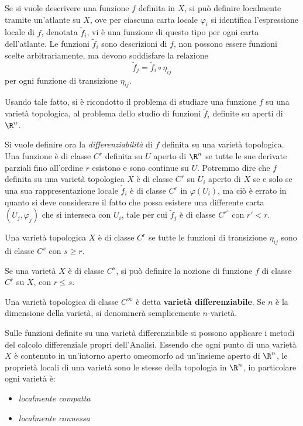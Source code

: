 \documentclass[10pt, letterpaper]{report}
\begin{document}
Se si vuole descrivere una funzione $f$ definita in $X$, si può definire localmente tramite un'atlante su $X$, ove per ciascuna carta locale $\varphi_i$ si identifica l'espressione locale di $f$, denotata $\tilde f_i$, vi è una funzione di questo tipo per ogni carta dell'atlante. Le funzioni $\tilde f_i$ sono descrizioni di $f$, non possono essere funzioni scelte arbitrariamente, ma devono soddisfare la relazione \begin{equation}
    \tilde f_j = \tilde f_i\circ\eta_{ij}
\end{equation}
per ogni funzione di transizione $\eta_{ij}$.\begin{osservazione}
    Usando tale fatto, si è ricondotto il problema di studiare una funzione $f$ su una varietà topologica, al problema dello studio di funzioni $\tilde f_i$ definite su aperti di $\R^n$.
\end{osservazione}
Si vuole definire ora la \textit{differenziabilità} di $f$ definita su una varietà topologica. Una funzione è di classe $C^r$ definita su $U$ aperto di $\R^n$ se tutte le sue derivate parziali fino all'ordine $r$ esistono e sono continue su $U$. Potremmo dire che $f$ definita su una varietà topologica $X$ è di classe $C^r$ su $U_i$ aperto di $X$ se e solo se una sua rappresentazione locale $\tilde f_i$ è di classe $C^r$ in $\varphi(U_i)$, ma ciò è errato in quanto si deve considerare il fatto che possa esistere una differente carta $(U_j,\varphi_j)$ che si interseca con $U_i$, tale per cui $\tilde f_j$ è di classe $C^{r'}$ con $r'<r$.
\begin{definizione}
    Una varietà topologica $X$ è di classe $C^r$ se tutte le funzioni di transizione $\eta_{ij}$ sono di classe $C^s$ con $s\ge r$.
\end{definizione}
\begin{osservazione}
    Se una varietà $X$ è di classe $C^s$, si può definire la nozione di funzione $f$ di classe $C^r$ su $X$, con $r\le s$.
\end{osservazione}
\begin{definizione}
    Una varietà topologica di classe $C^\infty$ è detta \textbf{varietà differenziabile}. Se $n$ è la dimensione della varietà, si denominerà semplicemente $n$-varietà.
\end{definizione}
Sulle funzioni definite su una varietà differenziabile si possono applicare i metodi del calcolo differenziale propri dell'Analisi. Essendo che ogni punto di una varietà $X$ è contenuto in un'intorno aperto omeomorfo ad un'insieme aperto di $\R^n$, le proprietà locali di una varietà sono le stesse della topologia in $\R^n$, in particolare ogni varietà è:\begin{itemize}
    \item \textit{localmente compatta}
    \item \textit{localmente connessa}
\end{itemize}
\end{document}
